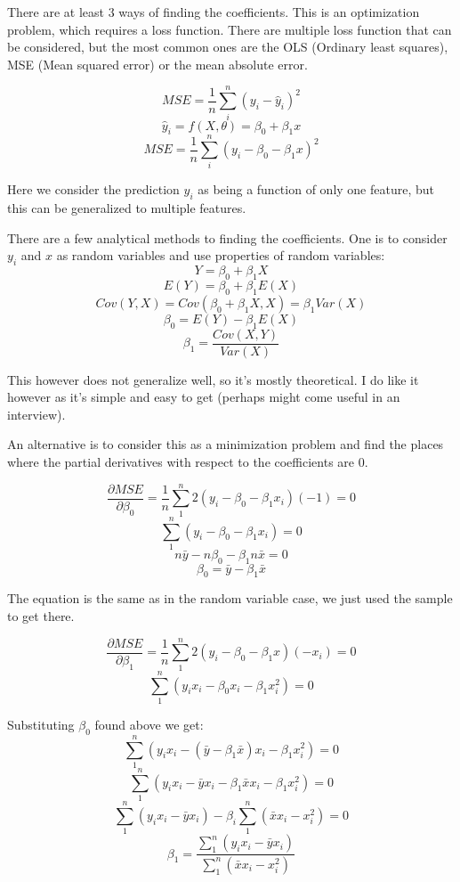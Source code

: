 \documentclass[12pt,a4paper]{article}
\begin{document}
There are at least 3 ways of finding the coefficients. This is an optimization problem, which requires a loss function. There are multiple loss function that can be considered, but the most common ones are the OLS (Ordinary least squares), MSE (Mean squared error) or the mean absolute error.

$$ MSE = \frac{1}{n}\sum_{i}^{n}(y_{i} - \hat{y}_{i})^{2}$$
$$ \hat{y}_{i} = f(X, \theta) = \beta_{0} + \beta_{1}x$$ 
$$ MSE = \frac{1}{n}\sum_{i}^{n}(y_{i} - \beta_{0} - \beta_{1}x)^{2}$$

Here we consider the prediction $y_{i}$ as being a function of only one feature, but this can be generalized to multiple features.

There are a few analytical methods to finding the coefficients. One is to consider $y_{i}$ and $x$ as random variables and use properties of random variables:
$$Y = \beta_{0} + \beta_{1}X$$ 
$$E(Y) = \beta_{0} + \beta_{1}E(X)$$
$$Cov(Y, X) = Cov(\beta_{0} + \beta_{1}X, X) = \beta_{1}Var(X)$$
$$\beta_{0} = E(Y) - \beta_{1}E(X)$$
$$\beta_{1} = \frac{Cov(X, Y)}{Var(X)}$$

This however does not generalize well, so it's mostly theoretical. I do like it however as it's simple and easy to get (perhaps might come useful in an interview). 

An alternative is to consider this as a minimization problem and find the places where the partial derivatives with respect to the coefficients are 0.

$$ \frac{\partial{MSE}}{\partial\beta_{0}} = \frac{1}{n}\sum_{1}^{n}2(y_{i} - \beta_{0} - \beta_{1}x_{i})(-1) = 0$$
$$ \sum_{1}^{n}(y_{i} - \beta_{0} - \beta_{1}x_{i}) = 0 $$
$$ n\bar{y} - n\beta_{0} - \beta_{1}n\bar{x} = 0$$
$$ \beta_{0} = \bar{y} - \beta_{1}\bar{x} $$

The equation is the same as in the random variable case, we just used the sample to get there.

$$ \frac{\partial{MSE}}{\partial\beta_{1}} = \frac{1}{n}\sum_{1}^{n}2(y_{i} - \beta_{0} - \beta_{1}x)(-x_{i}) = 0 $$
$$ \sum_{1}^{n}({y_{i}x_{i} - \beta_{0}x_{i}} - \beta_{1}x_{i}^{2}) = 0$$

Substituting $\beta_{0}$ found above we get:
$$ \sum_{1}^{n}(y_{i}x_{i} - (\bar{y} - \beta_{1}\bar{x})x_{i} - \beta_{1}x_{i}^2) = 0$$
$$\sum_{1}^{n} (y_{i}x_{i} - \bar{y}x_{i} - \beta_{1}\bar{x}x_{i} - \beta_{1}x_{i}^2) = 0$$
$$\sum_{1}^{n}(y_{i}x_{i} - \bar{y}{x_{i}}) - \beta_{i}\sum_{1}^{n}(\bar{x}x_{i} - x_{i}^2) = 0$$
$$\beta_{1} = \frac{\sum_{1}^{n}(y_{i}x_{i} - \bar{y}{x_{i}})}{\sum_{1}^{n}(\bar{x}x_{i} - x_{i}^2)}$$
\end{document}
